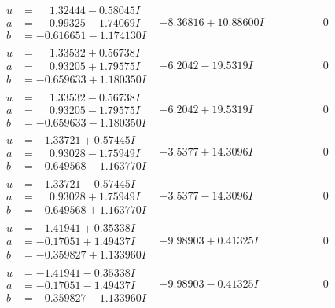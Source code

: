 \documentclass[1p]{elsarticle_modified}
\theoremstyle{definition}
\begin{document}
$$\begin{array}{c|c|c}
\begin{aligned}
u &= \phantom{-}1.32444 - 0.58045 I \\
a &= \phantom{-}0.99325 - 1.74069 I \\
b &= -0.616651 - 1.174130 I\end{aligned}
 & -8.36816 + 10.88600 I & \phantom{-0.000000 } 0 \\ \hline\begin{aligned}
u &= \phantom{-}1.33532 + 0.56738 I \\
a &= \phantom{-}0.93205 + 1.79575 I \\
b &= -0.659633 + 1.180350 I\end{aligned}
 & -6.2042 - 19.5319 I & \phantom{-0.000000 } 0 \\ \hline\begin{aligned}
u &= \phantom{-}1.33532 - 0.56738 I \\
a &= \phantom{-}0.93205 - 1.79575 I \\
b &= -0.659633 - 1.180350 I\end{aligned}
 & -6.2042 + 19.5319 I & \phantom{-0.000000 } 0 \\ \hline\begin{aligned}
u &= -1.33721 + 0.57445 I \\
a &= \phantom{-}0.93028 - 1.75949 I \\
b &= -0.649568 - 1.163770 I\end{aligned}
 & -3.5377 + 14.3096 I & \phantom{-0.000000 } 0 \\ \hline\begin{aligned}
u &= -1.33721 - 0.57445 I \\
a &= \phantom{-}0.93028 + 1.75949 I \\
b &= -0.649568 + 1.163770 I\end{aligned}
 & -3.5377 - 14.3096 I & \phantom{-0.000000 } 0 \\ \hline\begin{aligned}
u &= -1.41941 + 0.35338 I \\
a &= -0.17051 + 1.49437 I \\
b &= -0.359827 + 1.133960 I\end{aligned}
 & -9.98903 + 0.41325 I & \phantom{-0.000000 } 0 \\ \hline\begin{aligned}
u &= -1.41941 - 0.35338 I \\
a &= -0.17051 - 1.49437 I \\
b &= -0.359827 - 1.133960 I\end{aligned}
 & -9.98903 - 0.41325 I & \phantom{-0.000000 } 0 \\ \hline\begin{aligned}

\end{aligned}
\end{array}$$
\end{document}
